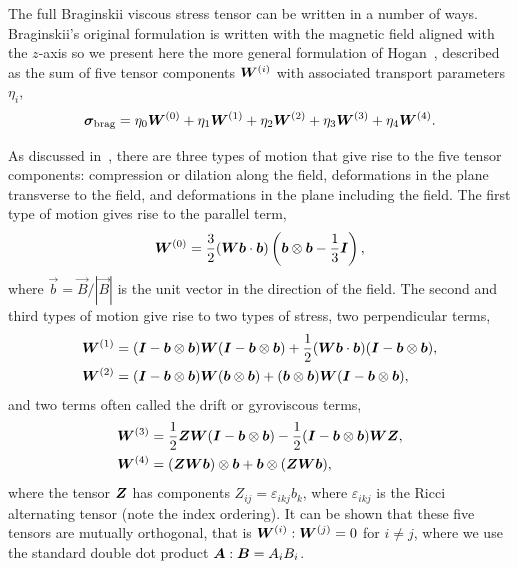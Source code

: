 The full Braginskii viscous stress tensor can be written in a number of ways. Braginskii's original formulation is written with the magnetic field aligned with the $z$-axis so we present here the more general formulation of Hogan~\cite{hoganCollisionalTransportMomentum1984}, described as the sum of five tensor components ${\bm W}^{(i)}$ with associated transport parameters $\eta_i$,
\begin{equation}
\label{eq:braginskii_tensor}
{\bm \sigma}_{\text{brag}} = \eta_0 {\bm W}^{(0)} + \eta_1 {\bm W}^{(1)} + \eta_2 {\bm W}^{(2)} + \eta_3 {\bm W}^{(3)} + \eta_4 {\bm W}^{(4)}.
\end{equation}

As discussed in~\cite{kaufmanPlasmaViscosityMagnetic1960}, there are three types of motion that give rise to the five tensor components: compression or dilation along the field, deformations in the plane transverse to the field, and deformations in the plane including the field. The first type of motion gives rise to the parallel term,
\begin{equation}
  \label{eq:braginskii_parallel_term}
  {\bm W}^{(0)} = \frac{3}{2}({\bm W}{\bm b}\cdot{\bm b}) \left( {\bm b} \otimes {\bm b} - \frac{1}{3}{\bm I} \right),
\end{equation}
where $\vec{b} = \vec{B}/|\vec{B}|$ is the unit vector in the direction of the field. The second and third types of motion give rise to two types of stress, two perpendicular terms,
\begin{align}
{\bm W}^{(1)} &= ({\bm I} - {\bm b} \otimes {\bm b}){\bm W}({\bm I} - {\bm b} \otimes {\bm b}) + \frac{1}{2}({\bm W}{\bm b} \cdot {\bm b})({\bm I} - {\bm b} \otimes {\bm b}), \\
{\bm W}^{(2)} &= ({\bm I} - {\bm b} \otimes {\bm b}){\bm W}({\bm b} \otimes {\bm b}) + ({\bm b} \otimes {\bm b}){\bm W}({\bm I} - {\bm b} \otimes {\bm b}),  \\
\end{align}
and two terms often called the drift or gyroviscous terms,
\begin{align}
{\bm W}^{(3)} &= \frac{1}{2} {\bm Z}{\bm W}({\bm I} - {\bm b} \otimes {\bm b}) - \frac{1}{2}({\bm I} - {\bm b} \otimes {\bm b}){\bm W}{\bm Z}, \\
{\bm W}^{(4)} &= ({\bm Z}{\bm W}{\bm b}) \otimes {\bm b} + {\bm b} \otimes ({\bm Z} {\bm W} {\bm b}), \\
\label{eq:drift_terms}
\end{align}
where the tensor ${\bm Z}$ has components $Z_{ij} = \varepsilon_{ikj}b_k$, where $\varepsilon_{ikj}$ is the Ricci alternating tensor (note the index ordering). It can be shown that these five tensors are mutually orthogonal, that is ${\bm W}^{(i)}:{\bm W}^{(j)} = 0$ for $i\ne j$, where we use the standard double dot product ${\bm A}:{\bm B} = A_iB_i$.

